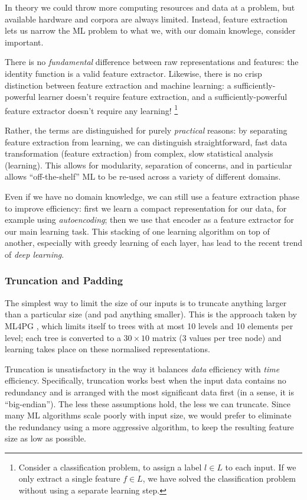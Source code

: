 In theory we could throw more computing resources and data at a problem, but
available hardware and corpora are always limited. Instead, feature extraction
lets us narrow the ML problem to what we, with our domain knowlege, consider
important.

There is no \emph{fundamental} difference between raw representations and
features: the identity function is a valid feature extractor. Likewise, there is
no crisp distinction between feature extraction and machine learning: a
sufficiently-powerful learner doesn't require feature extraction, and a
sufficiently-powerful feature extractor doesn't require any learning!
\footnote{Consider a classification problem, to assign a label $l \in L$ to each
  input. If we only extract a single feature $f \in L$, we have solved the
  classification problem without using a separate learning step.}

Rather, the terms are distinguished for purely \emph{practical} reasons: by
separating feature extraction from learning, we can distinguish straightforward,
fast data transformation (feature extraction) from complex, slow statistical
analysis (learning). This allows for modularity, separation of concerns, and in
particular allows ``off-the-shelf'' ML to be re-used across a variety of
different domains.

Even if we have no domain knowledge, we can still use a feature extraction phase
to improve efficiency: first we learn a compact representation for our data, for
example using \emph{autoencoding}; then we use that encoder as a feature
extractor for our main learning task. This stacking of one learning algorithm on
top of another, especially with greedy learning of each layer, has lead to the
recent trend of \emph{deep learning}.

\subsubsection{Truncation and Padding}

The simplest way to limit the size of our inputs is to truncate anything larger
than a particular size (and pad anything smaller). This is the approach taken by
ML4PG \cite{journals/corr/abs-1302-6421}, which limits itself to trees with at
most 10 levels and 10 elements per level; each tree is converted to a
$30 \times 10$ matrix (3 values per tree node) and learning takes place on these
normalised representations.

Truncation is unsatisfactory in the way it balances \emph{data} efficiency with
\emph{time} efficiency. Specifically, truncation works best when the input data
contains no redundancy and is arranged with the most significant data first (in
a sense, it is ``big-endian''). The less these assumptions hold, the less we can
truncate. Since many ML algorithms scale poorly with input size, we would prefer
to eliminate the redundancy using a more aggressive algorithm, to keep the
resulting feature size as low as possible.

